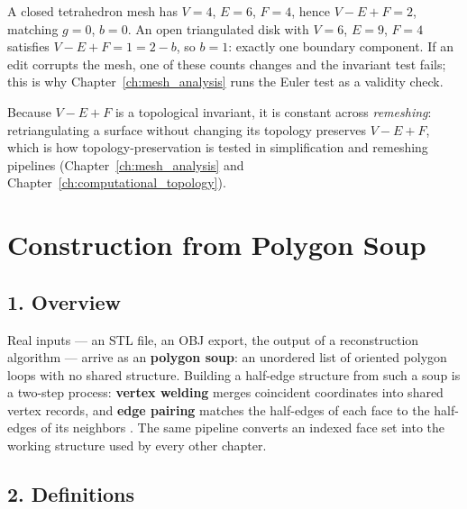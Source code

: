 \begin{example}
A closed tetrahedron mesh has $V = 4$, $E = 6$, $F = 4$, hence
$V - E + F = 2$, matching $g = 0$, $b = 0$. An open triangulated disk with
$V = 6$, $E = 9$, $F = 4$ satisfies $V - E + F = 1 = 2 - b$, so $b = 1$:
exactly one boundary component. If an edit corrupts the mesh, one of these
counts changes and the invariant test fails; this is why
Chapter~\ref{ch:mesh_analysis} runs the Euler test as a validity check.
\end{example}

\begin{remark}
Because $V - E + F$ is a topological
invariant, it is constant across \emph{remeshing}: retriangulating a
surface without changing its topology preserves $V - E + F$, which is how
topology-preservation is tested in simplification and remeshing pipelines
(Chapter~\ref{ch:mesh_analysis} and Chapter~\ref{ch:computational_topology}).
\end{remark}


\section{Construction from Polygon Soup}
\label{sec:halfedge_construction}

\subsection{1. Overview}

Real inputs --- an STL file, an OBJ export, the output of a
reconstruction algorithm --- arrive as an \textbf{polygon
soup}: an unordered list of oriented polygon loops with no shared
structure. Building a half-edge structure from such a soup is a two-step
process: \textbf{vertex welding} merges coincident coordinates into shared
vertex records, and \textbf{edge pairing} matches the half-edges of each
face to the half-edges of its neighbors \cite{botsch2010,deberg2008}. The
same pipeline converts an indexed face set into the working structure used
by every other chapter.

\subsection{2. Definitions}


